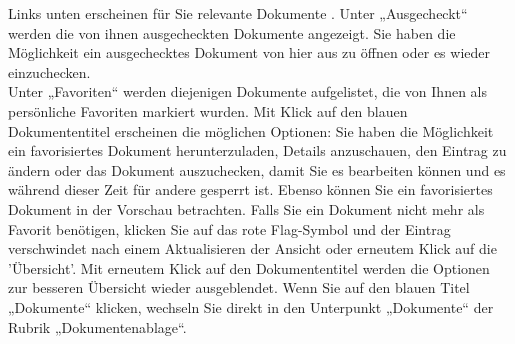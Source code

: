 Links unten erscheinen für Sie relevante Dokumente . Unter „Ausgecheckt“ werden die von ihnen ausgecheckten Dokumente angezeigt. Sie haben die Möglichkeit ein ausgechecktes Dokument von hier aus zu öffnen oder es wieder einzuchecken. \\

Unter „Favoriten“ werden diejenigen Dokumente aufgelistet, die von Ihnen als persönliche Favoriten markiert wurden. Mit Klick auf den blauen Dokumententitel erscheinen die möglichen Optionen: Sie haben die Möglichkeit ein favorisiertes Dokument herunterzuladen, Details anzuschauen, den Eintrag zu ändern oder das Dokument auszuchecken, damit Sie es bearbeiten können und es während dieser Zeit für andere gesperrt ist. Ebenso können Sie ein favorisiertes Dokument in der Vorschau betrachten. Falls Sie ein Dokument nicht mehr als Favorit benötigen, klicken Sie auf das rote Flag-Symbol und der Eintrag verschwindet nach einem Aktualisieren der Ansicht oder erneutem Klick auf die 'Übersicht'. Mit erneutem Klick auf den Dokumententitel werden die Optionen zur besseren Übersicht wieder ausgeblendet. Wenn Sie auf den blauen Titel „Dokumente“  klicken, wechseln Sie direkt in den Unterpunkt „Dokumente“ der Rubrik „Dokumentenablage“.

\vspace{\baselineskip}


